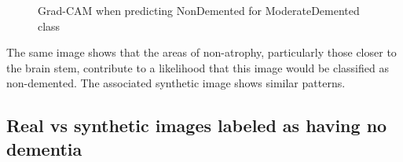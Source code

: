\documentclass [MAS] {uclathes}
\begin{document}
\begin{figure}[H]
    \centering
    \hspace{0.001\textwidth}
    \caption{Grad-CAM when predicting NonDemented for ModerateDemented class}
\end{figure}

The same image shows that the areas of non-atrophy, particularly those closer to the brain stem, contribute to a 
likelihood that this image would be classified as non-demented. The associated synthetic image shows similar patterns.

\subsection{Real vs synthetic images labeled as having no dementia}
\end{document}
